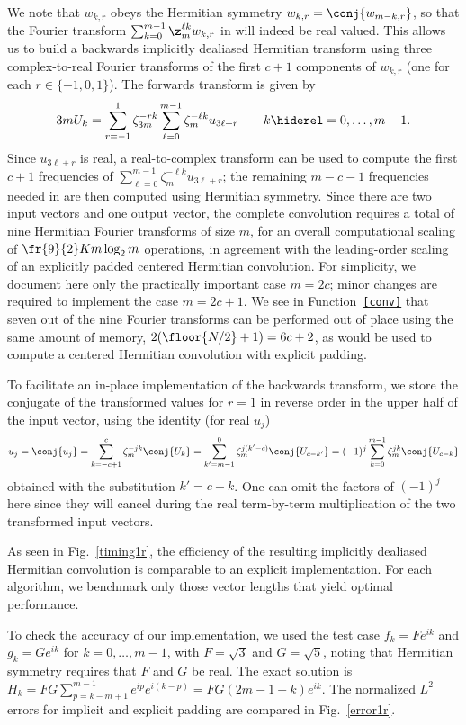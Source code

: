 \documentclass[final]{siamltex}
\def\bel{\begin{dmath}}
\def\eel{\end{dmath}}
\def\no{\hiderel}
\begin{document}
We note that $w_{k,r}$ obeys the Hermitian symmetry 
$w_{k,r}=\conj{w_{m-k,r}}$, so that the Fourier transform
$\sum_{k=0}^{m-1}\z_m^{\ell k} w_{k,r}$ in  will indeed
be real valued. This allows us to build a backwards implicitly dealiased
Hermitian transform using three complex-to-real Fourier transforms of the
first $c+1$ components of $w_{k,r}$ (one for each $r\in\{-1,0,1\}$). The
forwards transform is given by
\bel
{3m}U_k
=\sum_{r=-1}^{1}\zeta_{3m}^{-rk}\sum_{\ell=0}^{m-1}\zeta_m^{-\ell k} u_{3\ell+r}
\qquad k\no =0,\ldots,m-1.\label{fft0forwardsB}
\eel
Since $u_{3\ell+r}$ is real, a real-to-complex transform can be used to
compute the first $c+1$ frequencies of
$\sum_{\ell=0}^{m-1}\zeta_m^{-\ell k} u_{3\ell+r}$; the remaining $m-c-1$
frequencies needed in  are then computed using Hermitian
symmetry. Since there are two input vectors and
one output vector, the complete convolution requires a total of nine
Hermitian Fourier transforms of size $m$, for an overall computational
scaling of $\fr{9}{2}K m \log_2 m$ operations, in agreement with the
leading-order scaling of an explicitly padded centered Hermitian convolution.
For simplicity, we document here only the practically important
case $m=2c$; minor changes are required to implement the case $m=2c+1$.
We see in Function~{\tt\ref{conv}} that seven out of the nine Fourier
transforms can be performed out of place using the same amount of memory,
$2(\floor{N/2}+1)=6c+2$, as would be used to compute a centered Hermitian
convolution with explicit padding. 

To facilitate an in-place implementation of the
backwards transform, we store the conjugate of the transformed values for
$r=1$ in reverse order in the upper half of the input vector,
using the identity (for real $u_j$)
$$
u_j=\conj{u_j}=\sum_{k=-c+1}^{c}\zeta_m^{-jk} \conj{U_k}
=\sum_{k'=m-1}^{0}\zeta_m^{j(k'-c)} \conj{U_{c-k'}}
=(-1)^j\sum_{k=0}^{m-1}\zeta_m^{jk} \conj{U_{c-k}}
$$
obtained with the substitution $k'=c-k$. One can omit the factors of
$(-1)^j$ here since they will cancel during the real term-by-term multiplication
of the two transformed input vectors.

As seen in Fig.~\ref{timing1r}, the efficiency of the resulting implicitly
dealiased Hermitian convolution is comparable to an explicit implementation.
For each algorithm, we benchmark only those vector lengths that yield
optimal performance.

To check the accuracy of our implementation, we used the test case
$f_k=F e^{ik}$ and $g_k=G e^{ik}$ for $k=0,\ldots,m-1$,
with $F=\sqrt 3$ and $G=\sqrt 5$, noting that Hermitian symmetry
requires that $F$ and $G$ be real. The exact solution is 
$H_k=FG\sum_{p=k-m+1}^{m-1} e^{ip}e^{i(k-p)}=FG(2m-1-k)e^{ik}$.
The normalized $L^2$ errors for implicit and explicit padding are compared
in Fig.~\ref{error1r}.
\end{document}
